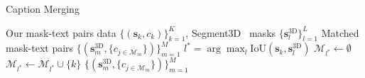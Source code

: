 \begin{algorithm}[t]
\caption{Caption Merging}
\label{alg:caption_merging}
\begin{algorithmic}[1]
\Require Our mask-text pairs data $\{(\mathbf{s}_k, c_k)\}_{k=1}^K$, Segment3D~\cite{huang2024segment3d} masks $\{\mathbf{s}_{l}^{\mathrm{3D}}\}_{l=1}^L$
\Ensure Matched mask-text pairs $\{(\mathbf{s}^{\mathrm{3D}}_m, \{c_{j\in \mathcal{M}_m}\})\}_{m=1}^M$
    \State $l^* = \arg\max_l \mathrm{IoU}(\mathbf{s}_k, \mathbf{s}_{l}^{\mathrm{3D}})$ 
        \State $\mathcal{M}_{l^*} \gets \emptyset$ 
    \EndIf
        \State $\mathcal{M}_{l^*} \gets \mathcal{M}_{l^*} \cup \{k\}$ 
    \EndIf
\EndFor
\State \Return $\{(\mathbf{s}^{\mathrm{3D}}_m, \{c_{j\in \mathcal{M}_m}\})\}_{m=1}^M$
\end{algorithmic}
\end{algorithm}
